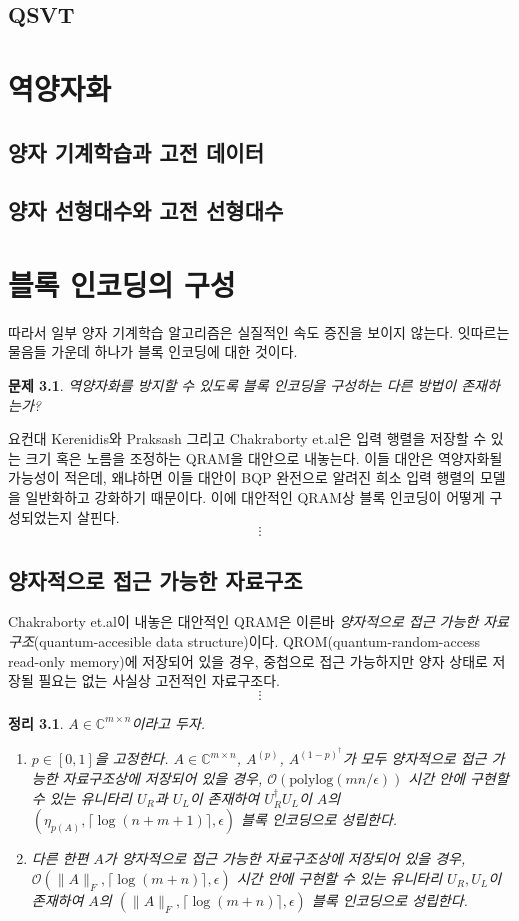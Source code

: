 \documentclass[hidelinks,article,a4paper,chapter,twocolumn]{oblivoir}
\newtheorem{theo}{정리}[chapter]
\newtheorem{prob}{문제}[chapter]
\let\oldbibliography
\renewcommand{}[1]{{%
\let\chapter\section
\oldbibliography{#1}}}
\begin{document}
\section{QSVT}
\chapter{역양자화}
\section{양자 기계학습과 고전 데이터}
\section{양자 선형대수와 고전 선형대수}
\chapter{블록 인코딩의 구성}
따라서 일부 양자 기계학습 알고리즘은 실질적인 속도 증진을 보이지 않는다. 잇따르는
물음들 가운데 하나가 블록 인코딩에 대한 것이다.
\begin{prob}
  역양자화를 방지할 수 있도록 블록 인코딩을 구성하는 다른 방법이 존재하는가?
\end{prob}
요컨대 Kerenidis와 Praksash\cite{kerenidis2020} 그리고 Chakraborty 
et.al\cite{chakraborty2018}은 입력 행렬을 저장할 수 있는 크기 혹은 노름을 조정하는
QRAM을 대안으로 내놓는다. 이들 대안은 역양자화될 가능성이 적은데, 왜냐하면
이들 대안이 BQP 완전으로 알려진 \cite{HHL2009} 희소 입력 행렬의 모델을 일반화하고
강화하기 때문이다. 이에 대안적인 QRAM상 블록 인코딩이 어떻게 구성되었는지 살핀다.
\[\pmb{\vdots}\]
\section{양자적으로 접근 가능한 자료구조}
Chakraborty et.al이 내놓은 대안적인 QRAM은 이른바 \emph{양자적으로 접근 가능한
자료구조}(quantum-accesible data structure)이다. QROM(quantum-random-access
read-only memory)에 저장되어 있을 경우,
중첩으로 접근 가능하지만 양자 상태로 저장될 필요는 없는 사실상 고전적인
자료구조다. 
\[\pmb{\vdots}\]
\begin{theo}
  $A\in\mathbb{C}^{m\times n}$이라고 두자. 
  \begin{enumerate}[label=(\roman*)]
    \item $p\in[0,1]$을 고정한다. $A\in\mathbb{C}^{m\times n}$, $A^(p)$, 
      $A^{(1-p)^{\dagger}}$가 모두 양자적으로 접근 가능한 자료구조상에 저장되어
      있을 경우, $\mathcal{O}(\textrm{polylog}(mn/\epsilon))$ 시간 안에
      구현할 수 있는 유니타리 $U_R$과 $U_L$이 존재하여 $U_R^{\dagger}U_L$이
      $A$의 $(\eta_{p(A)},\lceil\log(n+m+1)\rceil,\epsilon)$ 블록 인코딩으로
      성립한다.
    \item 다른 한편 $A$가 양자적으로 접근 가능한 자료구조상에 저장되어
      있을 경우, $\mathcal{O}(\|A\|_F,\lceil\log(m+n)\rceil, \epsilon)$
      시간 안에 구현할 수 있는 유니타리 $U_R,U_L$이 존재하여 $A$의
      $(\|A\|_F,\lceil\log(m+n)\rceil,\epsilon)$ 블록 인코딩으로 성립한다.
  \end{enumerate}
\end{theo}


\end{document}
